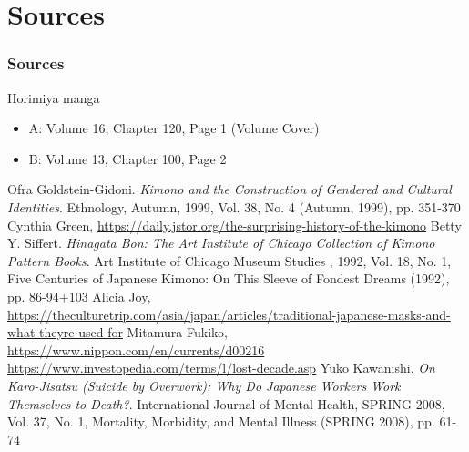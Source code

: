 \documentclass[aspectratio=169]{beamer}
\begin{document}
\section{Sources}
\begin{frame}[allowframebreaks]
    \frametitle{Sources}
    \begin{thebibliography}{00}
        Horimiya manga
        \begin{itemize}
            \item A: Volume 16, Chapter 120, Page 1 (Volume Cover)
            \item B: Volume 13, Chapter 100, Page 2
        \end{itemize}
        Ofra Goldstein-Gidoni.
        \textit{Kimono and the Construction of Gendered and Cultural Identities}.
        Ethnology, Autumn, 1999, Vol. 38, No. 4 (Autumn, 1999), pp. 351-370
        Cynthia Green,
        \href{https://daily.jstor.org/the-surprising-history-of-the-kimono/}{https://daily.jstor.org/the-surprising-history-of-the-kimono}
        Betty Y. Siffert.
        \textit{Hinagata Bon: The Art Institute of Chicago Collection of Kimono Pattern Books}.
        Art Institute of Chicago Museum Studies , 1992, Vol. 18, No. 1, Five Centuries of Japanese Kimono: On This Sleeve of Fondest Dreams (1992), pp. 86-94+103
        Alicia Joy,
        \href{https://theculturetrip.com/asia/japan/articles/traditional-japanese-masks-and-what-theyre-used-for/}{https://theculturetrip.com/asia/japan/articles/traditional-japanese-masks-and-what-theyre-used-for}
        Mitamura Fukiko,
        \href{https://www.nippon.com/en/currents/d00216/}{https://www.nippon.com/en/currents/d00216}
        \href{https://www.investopedia.com/terms/l/lost-decade.asp}{https://www.investopedia.com/terms/l/lost-decade.asp}
        Yuko Kawanishi.
        \textit{On Karo-Jisatsu (Suicide by Overwork): Why Do Japanese Workers Work Themselves to Death?}.
        International Journal of Mental Health, SPRING 2008, Vol. 37, No. 1, Mortality, Morbidity, and Mental Illness (SPRING 2008), pp. 61-74
    \end{thebibliography}
\end{frame}
\end{document}
